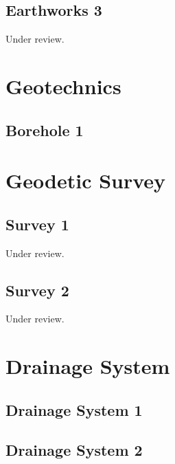 \documentclass{scrartcl}
\begin{document}
\subsection{Earthworks 3}
\label{sec:earth_3}
Under review.%
\clearpage

\section{Geotechnics}

\subsection{Borehole 1}
\label{sec:borehole_1}
\clearpage

\section{Geodetic Survey}

\subsection{Survey 1}
\label{sec:survey_1}
Under review.%
\clearpage

\subsection{Survey 2}
\label{sec:survey_2}
Under review.%
\clearpage


\section{Drainage System}

\subsection{Drainage System 1}
\label{sec:drainage_1}
\clearpage

\subsection{Drainage System 2}
\label{sec:drainage_2}
\clearpage
\end{document}
